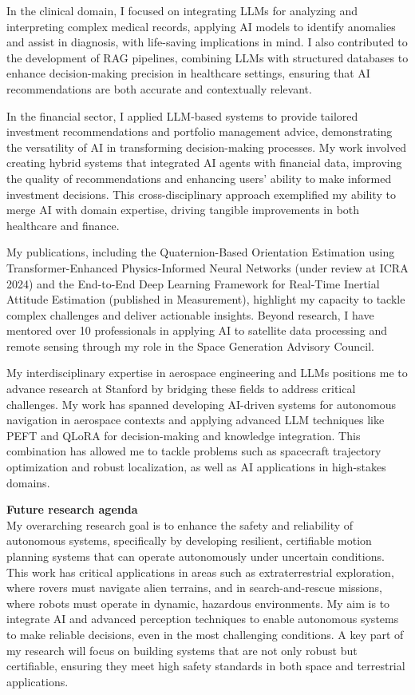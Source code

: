 \documentclass[a4,20pt]{article}
\begin{document}
\begin{large}
In the clinical domain, I focused on integrating LLMs for analyzing and interpreting complex medical records, applying AI models to identify anomalies and assist in diagnosis, with life-saving implications in mind. I also contributed to the development of RAG pipelines, combining LLMs with structured databases to enhance decision-making precision in healthcare settings, ensuring that AI recommendations are both accurate and contextually relevant.

In the financial sector, I applied LLM-based systems to provide tailored investment recommendations and portfolio management advice, demonstrating the versatility of AI in transforming decision-making processes. My work involved creating hybrid systems that integrated AI agents with financial data, improving the quality of recommendations and enhancing users' ability to make informed investment decisions. This cross-disciplinary approach exemplified my ability to merge AI with domain expertise, driving tangible improvements in both healthcare and finance.



My publications, including the Quaternion-Based Orientation Estimation using Transformer-Enhanced Physics-Informed Neural Networks (under review at ICRA 2024) and the End-to-End Deep Learning Framework for Real-Time Inertial Attitude Estimation (published in Measurement), highlight my capacity to tackle complex challenges and deliver actionable insights. Beyond research, I have mentored over 10 professionals in applying AI to satellite data processing and remote sensing through my role in the Space Generation Advisory Council. 

My interdisciplinary expertise in aerospace engineering and LLMs positions me to advance research at Stanford by bridging these fields to address critical challenges. My work has spanned developing AI-driven systems for autonomous navigation in aerospace contexts and applying advanced LLM techniques like PEFT and QLoRA for decision-making and knowledge integration. This combination has allowed me to tackle problems such as spacecraft trajectory optimization and robust localization, as well as AI applications in high-stakes domains.

\textbf{Future research agenda}\\
My overarching research goal is to enhance the safety and reliability of autonomous systems, specifically by developing resilient, certifiable motion planning systems that can operate autonomously under uncertain conditions. This work has critical applications in areas such as extraterrestrial exploration, where rovers must navigate alien terrains, and in search-and-rescue missions, where robots must operate in dynamic, hazardous environments. My aim is to integrate AI and advanced perception techniques to enable autonomous systems to make reliable decisions, even in the most challenging conditions. A key part of my research will focus on building systems that are not only robust but certifiable, ensuring they meet high safety standards in both space and terrestrial applications.


\end{large}
\end{document}
